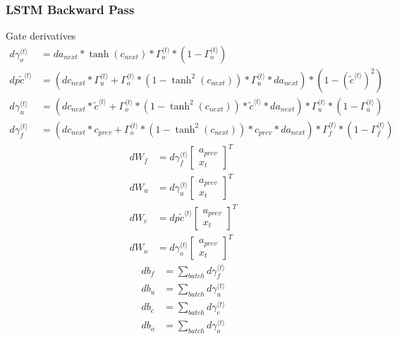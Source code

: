 \subsubsection{LSTM Backward Pass}
Gate derivatives
\begin{align}
d\gamma_o^{\langle t \rangle} &= da_{next}*\tanh(c_{next}) * \Gamma_o^{\langle t \rangle}*\left(1-\Gamma_o^{\langle t \rangle}\right)\\
dp\widetilde{c}^{\langle t \rangle} &= \left(dc_{next}*\Gamma_u^{\langle t \rangle}+ \Gamma_o^{\langle t \rangle}* (1-\tanh^2(c_{next})) * \Gamma_u^{\langle t \rangle} * da_{next} \right) * \left(1-\left(\widetilde c^{\langle t \rangle}\right)^2\right)\\
d\gamma_u^{\langle t \rangle} &= \left(dc_{next}*\widetilde{c}^{\langle t \rangle} + \Gamma_o^{\langle t \rangle}* (1-\tanh^2(c_{next})) * \widetilde{c}^{\langle t \rangle} * da_{next}\right)*\Gamma_u^{\langle t \rangle}*\left(1-\Gamma_u^{\langle t \rangle}\right)\\
d\gamma_f^{\langle t \rangle} &= \left(dc_{next}* c_{prev} + \Gamma_o^{\langle t \rangle} * (1-\tanh^2(c_{next})) * c_{prev} * da_{next}\right)*\Gamma_f^{\langle t \rangle}*\left(1-\Gamma_f^{\langle t \rangle}\right)
\end{align}
\begin{align}
dW_f &= d\gamma_f^{\langle t \rangle} \begin{bmatrix} a_{prev} \\ x_t\end{bmatrix}^T \\
dW_u &= d\gamma_u^{\langle t \rangle} \begin{bmatrix} a_{prev} \\ x_t\end{bmatrix}^T\\
dW_c &= dp\widetilde c^{\langle t \rangle} \begin{bmatrix} a_{prev} \\ x_t\end{bmatrix}^T\\
dW_o &= d\gamma_o^{\langle t \rangle} \begin{bmatrix} a_{prev} \\ x_t\end{bmatrix}^T
\end{align}
\begin{align}
db_f &= \sum_{batch}d\gamma_f^{\langle t \rangle}\\
db_u &= \sum_{batch}d\gamma_u^{\langle t \rangle}\\
db_c &= \sum_{batch}d\gamma_c^{\langle t \rangle}\\
db_o &= \sum_{batch}d\gamma_o^{\langle t \rangle}
\end{align}
